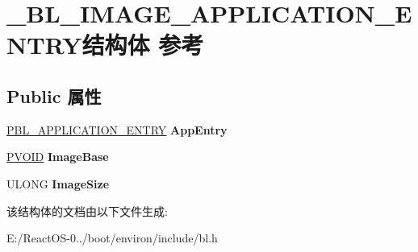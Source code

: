 \hypertarget{struct___b_l___i_m_a_g_e___a_p_p_l_i_c_a_t_i_o_n___e_n_t_r_y}{}\section{\+\_\+\+B\+L\+\_\+\+I\+M\+A\+G\+E\+\_\+\+A\+P\+P\+L\+I\+C\+A\+T\+I\+O\+N\+\_\+\+E\+N\+T\+R\+Y结构体 参考}
\label{struct___b_l___i_m_a_g_e___a_p_p_l_i_c_a_t_i_o_n___e_n_t_r_y}
\subsection*{Public 属性}
\begin{DoxyCompactItemize}
\item 
\mbox{\label{struct___b_l___i_m_a_g_e___a_p_p_l_i_c_a_t_i_o_n___e_n_t_r_y_a6f3bb7f3c1b9ac9a3ff9360880b824ae}} 
\hyperlink{struct___b_l___a_p_p_l_i_c_a_t_i_o_n___e_n_t_r_y}{P\+B\+L\+\_\+\+A\+P\+P\+L\+I\+C\+A\+T\+I\+O\+N\+\_\+\+E\+N\+T\+RY} {\bfseries App\+Entry}
\item 
\mbox{\label{struct___b_l___i_m_a_g_e___a_p_p_l_i_c_a_t_i_o_n___e_n_t_r_y_aacea1aec0026982921b94c557d0ccbb3}} 
\hyperlink{interfacevoid}{P\+V\+O\+ID} {\bfseries Image\+Base}
\item 
\mbox{\label{struct___b_l___i_m_a_g_e___a_p_p_l_i_c_a_t_i_o_n___e_n_t_r_y_aab73b9830a22842c48f9fb2dfcd9e082}} 
U\+L\+O\+NG {\bfseries Image\+Size}
\end{DoxyCompactItemize}


该结构体的文档由以下文件生成\+:\begin{DoxyCompactItemize}
\item 
E\+:/\+React\+O\+S-\/0../boot/environ/include/bl.\+h\end{DoxyCompactItemize}

